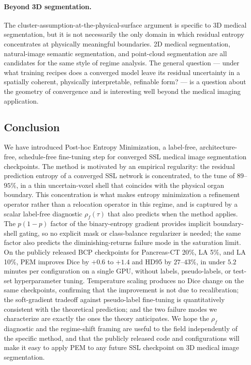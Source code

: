 \paragraph{Beyond 3D segmentation.}
The cluster-assumption-at-the-physical-surface argument is specific to 3D medical segmentation, but it is not necessarily the only domain in which residual entropy concentrates at physically meaningful boundaries. 2D medical segmentation, natural-image semantic segmentation, and point-cloud segmentation are all candidates for the same style of regime analysis. The general question --- under what training recipes does a converged model leave its residual uncertainty in a spatially coherent, physically interpretable, refinable form? --- is a question about the geometry of convergence and is interesting well beyond the medical imaging application.

\subsection{Conclusion}
\label{sec:disc:conclusion}

We have introduced Post-hoc Entropy Minimization, a label-free, architecture-free, schedule-free fine-tuning step for converged SSL medical image segmentation checkpoints. The method is motivated by an empirical regularity: the residual prediction entropy of a converged SSL network is concentrated, to the tune of $89$--$95\%$, in a thin uncertain-voxel shell that coincides with the physical organ boundary. This concentration is what makes entropy minimization a refinement operator rather than a relocation operator in this regime, and is captured by a scalar label-free diagnostic $\rho_f(\tau)$ that also predicts when the method applies. The $p(1{-}p)$ factor of the binary-entropy gradient provides implicit boundary-shell gating, so no explicit mask or class-balance regularizer is needed; the same factor also predicts the diminishing-returns failure mode in the saturation limit. On the publicly released BCP checkpoints for Pancreas-CT 20\%, LA 5\%, and LA 10\%, PEM improves Dice by $+0.6$ to $+1.4$ and HD95 by $27$--$43\%$, in under $5.2$ minutes per configuration on a single GPU, without labels, pseudo-labels, or test-set hyperparameter tuning. Temperature scaling produces no Dice change on the same checkpoints, confirming that the improvement is not due to recalibration; the soft-gradient tradeoff against pseudo-label fine-tuning is quantitatively consistent with the theoretical prediction; and the two failure modes we characterize are exactly the ones the theory anticipates. We hope the $\rho_f$ diagnostic and the regime-shift framing are useful to the field independently of the specific method, and that the publicly released code and configurations will make it easy to apply PEM to any future SSL checkpoint on 3D medical image segmentation.
